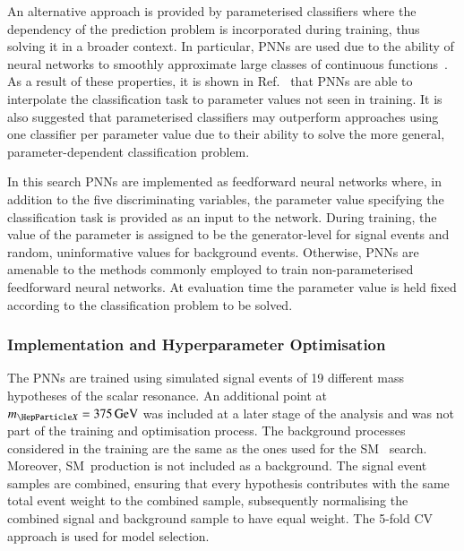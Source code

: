 An alternative approach is provided by parameterised classifiers where the
dependency of the prediction problem is incorporated during training, thus
solving it in a broader context. In particular, PNNs are used due to the ability
of neural networks to smoothly approximate large classes of continuous
functions~\cite{Baldi:2016fzo}. As a result of these properties, it is shown in
Ref.~\cite{Baldi:2016fzo} that PNNs are able to interpolate the classification
task to parameter values not seen in training. It is also suggested that
parameterised classifiers may outperform approaches using one classifier per
parameter value due to their ability to solve the more general,
parameter-dependent classification problem.

In this search PNNs are implemented as feedforward neural networks
where, in addition to the five discriminating variables, the parameter
value specifying the classification task is provided as an input to
the network. During training, the value of the parameter is assigned
to be the generator-level \mX for signal events and random,
uninformative values for background events. Otherwise, PNNs are
amenable to the methods commonly employed to train non-parameterised
feedforward neural networks. At evaluation time the parameter value is
held fixed according to the classification problem to be solved.


\subsubsection{Implementation and Hyperparameter Optimisation}

The PNNs are trained using simulated signal events of 19 different mass
hypotheses of the scalar resonance. An additional point at
$\mX = \SI{375}{\GeV}$ was included at a later stage of the analysis and was not
part of the training and optimisation process. The background processes
considered in the training are the same as the ones used for the SM~\HH
search. Moreover, SM~\HH production is not included as a background.
The signal event samples are combined, ensuring that every \mX hypothesis
contributes with the same total event weight to the combined sample,
subsequently normalising the combined signal and background sample to have equal
weight. The 5-fold CV approach is used for model selection.

